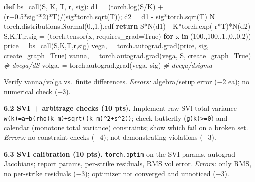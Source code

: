 \documentclass[
]{article}
\newenvironment{Shaded}{}{}
\newcommand{\CommentTok}[1]{\textcolor[rgb]{0.38,0.63,0.69}{\textit{#1}}}
\newcommand{\ControlFlowTok}[1]{\textcolor[rgb]{0.00,0.44,0.13}{\textbf{#1}}}
\newcommand{\DecValTok}[1]{\textcolor[rgb]{0.25,0.63,0.44}{#1}}
\newcommand{\FloatTok}[1]{\textcolor[rgb]{0.25,0.63,0.44}{#1}}
\newcommand{\KeywordTok}[1]{\textcolor[rgb]{0.00,0.44,0.13}{\textbf{#1}}}
\newcommand{\NormalTok}[1]{#1}
\newcommand{\OperatorTok}[1]{\textcolor[rgb]{0.40,0.40,0.40}{#1}}
\newcommand{\VariableTok}[1]{\textcolor[rgb]{0.10,0.09,0.49}{#1}}
\begin{document}
\begin{Shaded}
\begin{Highlighting}[]
\KeywordTok{def}\NormalTok{ bs\_call(S, K, T, r, sig):}
\NormalTok{    d1 }\OperatorTok{=}\NormalTok{ (torch.log(S}\OperatorTok{/}\NormalTok{K) }\OperatorTok{+}\NormalTok{ (r}\OperatorTok{+}\FloatTok{0.5}\OperatorTok{*}\NormalTok{sig}\OperatorTok{**}\DecValTok{2}\NormalTok{)}\OperatorTok{*}\NormalTok{T)}\OperatorTok{/}\NormalTok{(sig}\OperatorTok{*}\NormalTok{torch.sqrt(T))}\OperatorTok{;}\NormalTok{ d2 }\OperatorTok{=}\NormalTok{ d1 }\OperatorTok{{-}}\NormalTok{ sig}\OperatorTok{*}\NormalTok{torch.sqrt(T)}
\NormalTok{    N }\OperatorTok{=}\NormalTok{ torch.distributions.Normal(}\FloatTok{0.}\NormalTok{,}\FloatTok{1.}\NormalTok{).cdf}
    \ControlFlowTok{return}\NormalTok{ S}\OperatorTok{*}\NormalTok{N(d1) }\OperatorTok{{-}}\NormalTok{ K}\OperatorTok{*}\NormalTok{torch.exp(}\OperatorTok{{-}}\NormalTok{r}\OperatorTok{*}\NormalTok{T)}\OperatorTok{*}\NormalTok{N(d2)}
\NormalTok{S,K,T,r,sig }\OperatorTok{=}\NormalTok{ (torch.tensor(x, requires\_grad}\OperatorTok{=}\VariableTok{True}\NormalTok{) }\ControlFlowTok{for}\NormalTok{ x }\KeywordTok{in}\NormalTok{ (}\FloatTok{100.}\NormalTok{,}\FloatTok{100.}\NormalTok{,}\FloatTok{1.}\NormalTok{,}\FloatTok{0.}\NormalTok{,}\FloatTok{0.2}\NormalTok{))}
\NormalTok{price }\OperatorTok{=}\NormalTok{ bs\_call(S,K,T,r,sig)}
\NormalTok{vega, }\OperatorTok{=}\NormalTok{ torch.autograd.grad(price, sig, create\_graph}\OperatorTok{=}\VariableTok{True}\NormalTok{)}
\NormalTok{vanna, }\OperatorTok{=}\NormalTok{ torch.autograd.grad(vega, S, create\_graph}\OperatorTok{=}\VariableTok{True}\NormalTok{)   }\CommentTok{\# dvega/dS}
\NormalTok{volga, }\OperatorTok{=}\NormalTok{ torch.autograd.grad(vega, sig)                    }\CommentTok{\# dvega/dsigma}
\end{Highlighting}
\end{Shaded}

Verify vanna/volga vs.~finite differences. \emph{Errors:} algebra/setup
error (−2 ea); no numerical check (−3).

\textbf{6.2 SVI + arbitrage checks (10 pts).} Implement raw SVI total
variance \texttt{w(k)=a+b(rho(k-m)+sqrt((k-m)\^{}2+s\^{}2))}; check
butterfly (\texttt{g(k)\textgreater{}=0}) and calendar (monotone total
variance) constraints; show which fail on a broken set. \emph{Errors:}
no constraint checks (−4); not demonstrating violations (−3).

\textbf{6.3 SVI calibration (10 pts).} \texttt{torch.optim} on the SVI
params, autograd Jacobians; report params, per-strike residuals, RMS vol
error. \emph{Errors:} only RMS, no per-strike residuals (−3); optimizer
not converged and unnoticed (−3).
\end{document}
